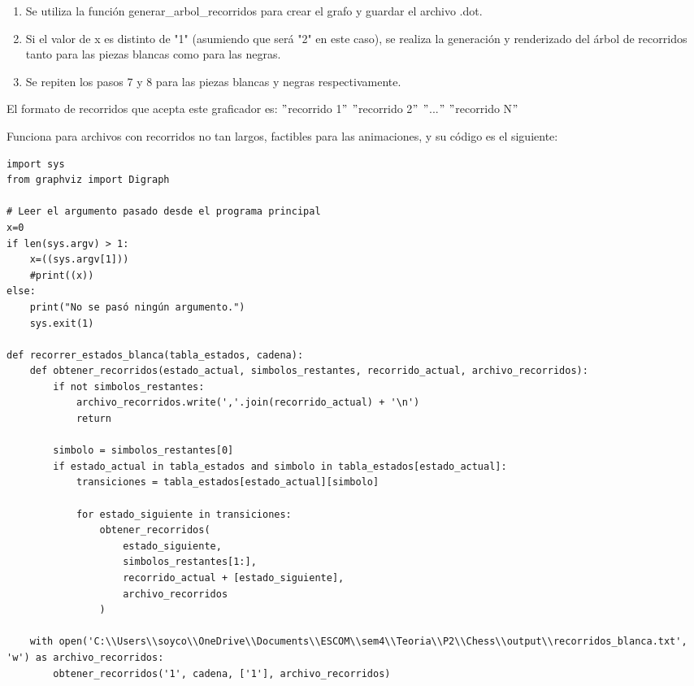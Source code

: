 \begin{enumerate}
\begin{enumerate}
    \item Se utiliza la función generar\_arbol\_recorridos para crear el grafo y guardar el archivo .dot.\newline
    \item Si el valor de x es distinto de "1" (asumiendo que será "2" en este caso), se realiza la generación y renderizado del árbol de recorridos tanto para las piezas blancas como para las negras.\newline
    \item Se repiten los pasos 7 y 8 para las piezas blancas y negras respectivamente.\newline
\end{enumerate}

El formato de recorridos que acepta este graficador es:\newline 
$"$recorrido 1$"$\newline 
$"$recorrido 2$"$\newline 
$"$...$"$\newline 
$"$recorrido N$"$\newline 

Funciona para archivos con recorridos no tan largos, factibles para las animaciones, y su código es el siguiente:\newline 
\begin{lstlisting}
import sys
from graphviz import Digraph

# Leer el argumento pasado desde el programa principal
x=0
if len(sys.argv) > 1:
    x=((sys.argv[1]))
    #print((x))
else:
    print("No se pasó ningún argumento.")
    sys.exit(1)

def recorrer_estados_blanca(tabla_estados, cadena):
    def obtener_recorridos(estado_actual, simbolos_restantes, recorrido_actual, archivo_recorridos):
        if not simbolos_restantes:
            archivo_recorridos.write(','.join(recorrido_actual) + '\n')
            return

        simbolo = simbolos_restantes[0]
        if estado_actual in tabla_estados and simbolo in tabla_estados[estado_actual]:
            transiciones = tabla_estados[estado_actual][simbolo]

            for estado_siguiente in transiciones:
                obtener_recorridos(
                    estado_siguiente,
                    simbolos_restantes[1:],
                    recorrido_actual + [estado_siguiente],
                    archivo_recorridos
                )

    with open('C:\\Users\\soyco\\OneDrive\\Documents\\ESCOM\\sem4\\Teoria\\P2\\Chess\\output\\recorridos_blanca.txt', 'w') as archivo_recorridos:
        obtener_recorridos('1', cadena, ['1'], archivo_recorridos)


\end{lstlisting}
\end{enumerate}
